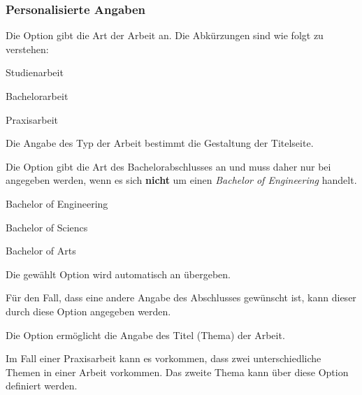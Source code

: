 \documentclass[babel=ngerman,highlight=false]{skdoc}
\begin{document}
            \subsubsection{Personalisierte Angaben}
                Die Option gibt die Art der Arbeit an. Die Abkürzungen sind wie folgt zu verstehen:
                \begin{description}[noitemsep,style=multiline,leftmargin=1cm]
                    \item[SA] Studienarbeit
                    \item[BA] Bachelorarbeit
                    \item[PA] Praxisarbeit
                \end{description}
                Die Angabe des Typ der Arbeit bestimmt die Gestaltung der Titelseite.\medskip

                Die Option gibt die Art des Bachelorabschlusses an und muss daher nur bei  angegeben werden, wenn es sich \textbf{nicht} um einen \textit{Bachelor of Engineering} handelt.
                \begin{description}[noitemsep,style=multiline,leftmargin=1cm]
                    \item[BoE] Bachelor of Engineering
                    \item[BoS] Bachelor of Sciencs
                    \item[BoA] Bachelor of Arts
                \end{description}
                Die gewählt Option wird automatisch an  übergeben.\medskip

                Für den Fall, dass eine andere Angabe des Abschlusses gewünscht ist, kann dieser durch diese Option angegeben werden.\medskip

                Die Option ermöglicht die Angabe des Titel (Thema) der Arbeit.\medskip

                Im Fall einer Praxisarbeit  kann es vorkommen, dass zwei unterschiedliche Themen in einer Arbeit vorkommen. Das zweite Thema kann über diese Option definiert werden.\medskip
\end{document}
